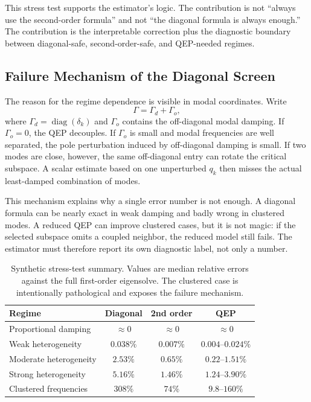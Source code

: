 \documentclass[journal]{IEEEtran}
\newcommand{\diag}{\operatorname{diag}}
\begin{document}
This stress test supports the estimator's logic. The contribution is not ``always use the second-order formula'' and not ``the diagonal formula is always enough.'' The contribution is the interpretable correction plus the diagnostic boundary between diagonal-safe, second-order-safe, and QEP-needed regimes.

\subsection{Failure Mechanism of the Diagonal Screen}

The reason for the regime dependence is visible in modal coordinates. Write
\begin{equation}
\Gamma=\Gamma_d+\Gamma_o,
\end{equation}
where $\Gamma_d=\diag(\delta_k)$ and $\Gamma_o$ contains the off-diagonal modal damping. If $\Gamma_o=0$, the QEP decouples. If $\Gamma_o$ is small and modal frequencies are well separated, the pole perturbation induced by off-diagonal damping is small. If two modes are close, however, the same off-diagonal entry can rotate the critical subspace. A scalar estimate based on one unperturbed $q_k$ then misses the actual least-damped combination of modes.

This mechanism explains why a single error number is not enough. A diagonal formula can be nearly exact in weak damping and badly wrong in clustered modes. A reduced QEP can improve clustered cases, but it is not magic: if the selected subspace omits a coupled neighbor, the reduced model still fails. The estimator must therefore report its own diagnostic label, not only a number.

\begin{table}[t]
\centering
\caption{Synthetic stress-test summary. Values are median relative errors against the full first-order eigensolve. The clustered case is intentionally pathological and exposes the failure mechanism.}
\label{tab:synthetic}
\begin{tabular}{lccc}
\toprule
Regime & Diagonal & 2nd order & QEP\\
\midrule
Proportional damping & $\approx 0$ & $\approx 0$ & $\approx 0$\\
Weak heterogeneity & $0.038\%$ & $0.007\%$ & $0.004$--$0.024\%$\\
Moderate heterogeneity & $2.53\%$ & $0.65\%$ & $0.22$--$1.51\%$\\
Strong heterogeneity & $5.16\%$ & $1.46\%$ & $1.24$--$3.90\%$\\
Clustered frequencies & $308\%$ & $74\%$ & $9.8$--$160\%$\\
\bottomrule
\end{tabular}
\end{table}
\end{document}
